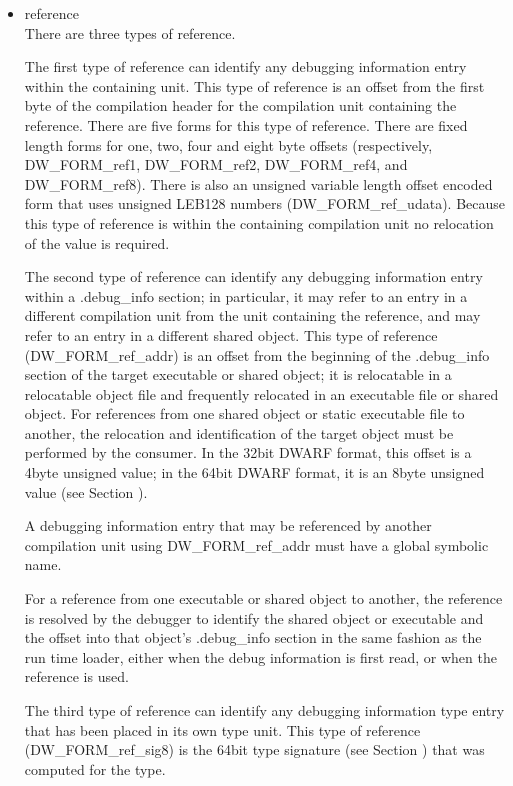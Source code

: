 \begin{itemize}
\item reference \\
There are three types of reference.

The first type of reference can identify any debugging
information entry within the containing unit. This type of
reference is an offset from the first byte of the compilation
header for the compilation unit containing the reference. There
are five forms for this type of reference. There are fixed
length forms for one, two, four and eight byte offsets
(respectively, DW\-\_FORM\-\_ref1, DW\-\_FORM\-\_ref2, DW\-\_FORM\-\_ref4,
and DW\-\_FORM\-\_ref8). There is also an unsigned variable
length offset encoded form that uses unsigned LEB128 numbers
(DW\-\_FORM\-\_ref\-\_udata). Because this type of reference is within
the containing compilation unit no relocation of the value
is required.

The second type of reference can identify any debugging
information entry within a .debug\_info section; in particular,
it may refer to an entry in a different compilation unit
from the unit containing the reference, and may refer to an
entry in a different shared object.  This type of reference
(DW\-\_FORM\-\_ref\-\_addr) is an offset from the beginning of the
.debug\_info section of the target executable or shared object;
it is relocatable in a relocatable object file and frequently
relocated in an executable file or shared object. For
references from one shared object or static executable file
to another, the relocation and identification of the target
object must be performed by the consumer. In the 32\dash bit DWARF
format, this offset is a 4\dash byte unsigned value; 
in the 64\dash bit DWARF format, it is an 8\dash byte
unsigned value 
(see Section ).

A debugging information entry that may be referenced by
another compilation unit using DW\-\_FORM\-\_ref\-\_addr must have a
global symbolic name.

For a reference from one executable or shared object to
another, the reference is resolved by the debugger to identify
the shared object or executable and the offset into that
object’s .debug\_info section in the same fashion as the run
time loader, either when the debug information is first read,
or when the reference is used.

The third type of reference can identify any debugging
information type entry that has been placed in its own
type unit. This type of reference (DW\-\_FORM\-\_ref\-\_sig8) is the
64\dash bit type signature 
(see Section ) 
that was computed
for the type.


\end{itemize}
